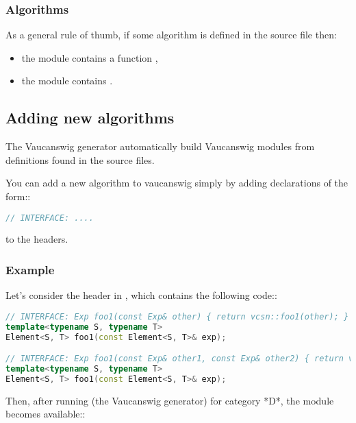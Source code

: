\subsubsection{Algorithms}

As a  general rule of thumb,  if some algorithm   is defined in
the source file  then:

\begin{itemize}
\item the module  contains a function
  ,
\item the module  contains
  .
\end{itemize}


\subsection{Adding new algorithms}
The Vaucanswig  generator automatically build  Vaucanswig modules from
definitions found in the \Vauc source files.

You  can  add   a  new  algorithm  to  vaucanswig   simply  by  adding
declarations of the form::

\begin{lstlisting}[language=C++]
// INTERFACE: ....
\end{lstlisting}

to the \Vauc headers.


\subsubsection{Example}

Let's consider the \Vauc header  in
, which contains the following
code::

\begin{lstlisting}[language=C++]
// INTERFACE: Exp foo1(const Exp& other) { return vcsn::foo1(other); }
template<typename S, typename T>
Element<S, T> foo1(const Element<S, T>& exp);

// INTERFACE: Exp foo1(const Exp& other1, const Exp& other2) { return vcsn::foo2(other1, other2); }
template<typename S, typename T>
Element<S, T> foo1(const Element<S, T>& exp);
\end{lstlisting}

Then,  after  running    (the Vaucanswig  generator)  for
category *D*, the module  becomes available::

